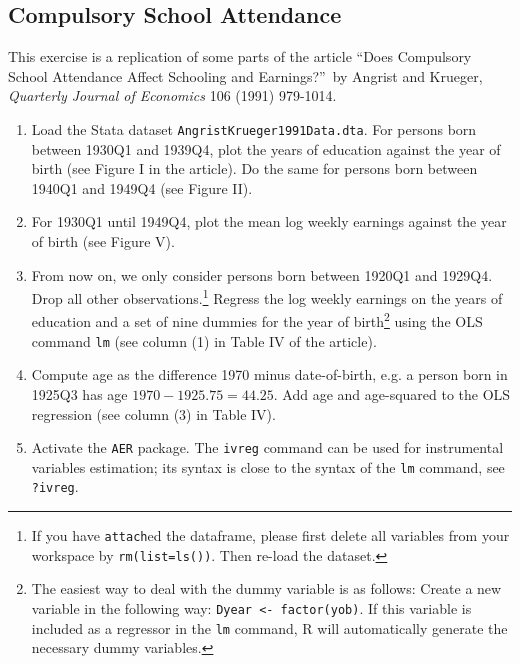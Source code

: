 \documentclass{article}
\begin{document}
\subsection{Compulsory School Attendance}

This exercise is a replication of some parts of the article
\textquotedblleft Does Compulsory School Attendance Affect Schooling and
Earnings?\textquotedblright\ by Angrist and Krueger, \emph{Quarterly Journal
of Economics }106 (1991) 979-1014.

\begin{enumerate}
\item Load the Stata dataset \texttt{AngristKrueger1991Data.dta}. For
persons born between 1930Q1 and 1939Q4, plot the years of education against
the year of birth (see Figure I in the article). Do the same for persons
born between 1940Q1 and 1949Q4 (see Figure II).

\item For 1930Q1 until 1949Q4, plot the mean log weekly earnings against the
year of birth (see Figure V).

\item From now on, we only consider persons born between 1920Q1 and 1929Q4.
Drop all other observations.\footnote{%
If you have \texttt{attach}ed the dataframe, please first delete all
variables from your workspace by \texttt{rm(list=ls())}. Then re-load the
dataset.} Regress the log weekly earnings on the years of education and a
set of nine dummies for the year of birth\footnote{%
The easiest way to deal with the dummy variable is as follows: Create a new
variable in the following way: \texttt{Dyear <- factor(yob)}.
If this variable is included as a regressor in the \texttt{lm} command, R
will automatically generate the necessary dummy variables.} using the OLS
command \texttt{lm} (see column (1) in Table IV of the article).

\item Compute age as the difference 1970 minus date-of-birth, e.g. a person
born in 1925Q3 has age $1970-1925.75=44.25$. Add age and age-squared to the
OLS regression (see column (3) in Table IV).

\item Activate the \texttt{AER} package. The \texttt{ivreg} command can be
used for instrumental variables estimation; its syntax is close to the
syntax of the \texttt{lm} command, see \texttt{?ivreg}.


\end{enumerate}
\end{document}
